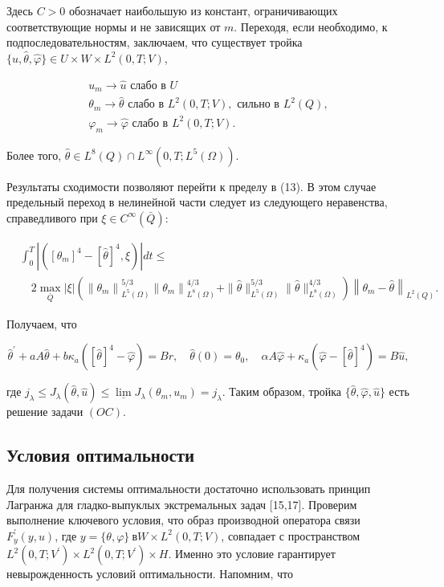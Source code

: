 Здесь $C>0$ обозначает наибольшую из констант, ограничивающих соответствующие нормы и не зависящих от $m$.
Переходя, если необходимо, к подпоследовательностям, заключаем, что существует тройка
$\{\widehat{u}, \widehat{\theta}, \widehat{\varphi}\} \in U \times W \times L^{2}(0, T; V)$,

\[
\begin{gathered}
u_{m} \rightarrow \widehat{u} \text { слабо в } U \\
\theta_{m} \rightarrow \widehat{\theta} \text{ слабо в } L^{2}(0, T; V), \text { сильно в } L^{2}(Q), \\
\varphi_{m} \rightarrow \widehat{\varphi} \text{ слабо в }  L^{2}(0, T ; V).
\end{gathered}
\]


Более того, $\widehat{\theta} \in L^{8}(Q) \cap L^{\infty}\left(0, T ; L^{5}(\Omega)\right)$.

Результаты сходимости позволяют перейти к пределу в (13).
В этом случае предельный переход в нелинейной части следует из следующего неравенства,
справедливого при $\xi \in C^{\infty}(\bar{Q})$:

\[
\begin{aligned}
& \int_{0}^{T}\left|\left(\left[\theta_{m}\right]^{4}-[\widehat{\theta}]^{4},
\xi\right)\right| d t \leq \\
& \quad 2 \max _{\bar{Q}}|\xi|\left(\left\|\theta_{m}\right\|_{L^{5}(\Omega)}^{5 / 3}\left\|
\theta_{m}\right\|_{L^{8}(\Omega)}^{4 / 3}+\|\widehat{\theta}\|_{L^{5}(\Omega)}^{5 / 3}
\|\widehat{\theta}\|_{L^{8}(\Omega)}^{4 / 3}\right)\left\|\theta_{m}-\widehat{\theta}\right\|_{L^{2}(Q)}.
\end{aligned}
\]


Получаем, что

\[
\widehat{\theta}^{\prime}+a A \widehat{\theta}+b
\kappa_{a}\left([\widehat{\theta}]^{4}-\widehat{\varphi}\right)=B r,
\quad \widehat{\theta}(0)=\theta_{0},
\quad \alpha A \widehat{\varphi}+\kappa_{a}\left(\widehat{\varphi}-
[\widehat{\theta}]^{4}\right)=B \widehat{u},
\]

где $j_{\lambda} \leq J_{\lambda}(\widehat{\theta},
\widehat{u}) \leq \underline{\lim }
J_{\lambda}\left(\theta_{m}, u_{m}\right)=j_{\lambda}$.
Таким образом, тройка $\{\widehat{\theta}, \widehat{\varphi}, \widehat{u}\}$ есть решение задачи $(OC)$.

\subsection{Условия оптимальности}\label{subsec:ch2/sec3/subsec4}
Для получения системы оптимальности достаточно использовать принцип Лагранжа
для гладко-выпуклых экстремальных задач [15,17].
Проверим выполнение ключевого условия,
что образ производной оператора связи $F_{y}^{\prime}(y, u)$,
где $y=\{\theta, \varphi\} \ в W \times L^{2}(0, T ; V)$,
совпадает с пространством
$L^{2}\left(0, T; V^{\prime}\right) \times L^{2} \left(0, T ; V^{\prime}\right) \times H$.
Именно это условие гарантирует невырожденность условий оптимальности.
Напомним, что

